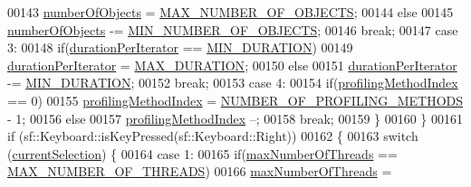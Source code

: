 \begin{DoxyCode}
00143                             \hyperlink{main_8cpp_a2303e0afaea24a80ed690de888548862}{numberOfObjects} = 
      \hyperlink{main_8cpp_aad62f3880f9d08f6213b65dc9373329e}{MAX\_NUMBER\_OF\_OBJECTS};
00144                         \textcolor{keywordflow}{else}
00145                             \hyperlink{main_8cpp_a2303e0afaea24a80ed690de888548862}{numberOfObjects} -= 
      \hyperlink{main_8cpp_a33029f68c1cf4a3c7c90cfb59edee648}{MIN\_NUMBER\_OF\_OBJECTS};
00146                         \textcolor{keywordflow}{break};
00147                     \textcolor{keywordflow}{case} 3:
00148                         \textcolor{keywordflow}{if}(\hyperlink{main_8cpp_a05d9b1ebdb968e99b310a90811f1be91}{durationPerIterator} == 
      \hyperlink{main_8cpp_af00d30c4c9cd2a4bcd0cb0084bcabd30}{MIN\_DURATION})
00149                             \hyperlink{main_8cpp_a05d9b1ebdb968e99b310a90811f1be91}{durationPerIterator} = 
      \hyperlink{main_8cpp_a2564fde0b4c94421653b40a37597aa62}{MAX\_DURATION};
00150                         \textcolor{keywordflow}{else}
00151                             \hyperlink{main_8cpp_a05d9b1ebdb968e99b310a90811f1be91}{durationPerIterator} -= 
      \hyperlink{main_8cpp_af00d30c4c9cd2a4bcd0cb0084bcabd30}{MIN\_DURATION};
00152                         \textcolor{keywordflow}{break};
00153                     \textcolor{keywordflow}{case} 4:
00154                         \textcolor{keywordflow}{if}(\hyperlink{main_8cpp_a610d48030bfa1d44ea8b35346a1b4b21}{profilingMethodIndex} == 0)
00155                             \hyperlink{main_8cpp_a610d48030bfa1d44ea8b35346a1b4b21}{profilingMethodIndex} = 
      \hyperlink{main_8cpp_aca088c8a49d09566c6c129c95c3e82c9}{NUMBER\_OF\_PROFILING\_METHODS} - 1;
00156                         \textcolor{keywordflow}{else}
00157                             \hyperlink{main_8cpp_a610d48030bfa1d44ea8b35346a1b4b21}{profilingMethodIndex} --;
00158                         \textcolor{keywordflow}{break};
00159                 \}
00160             \}
00161             \textcolor{keywordflow}{if} (sf::Keyboard::isKeyPressed(sf::Keyboard::Right))
00162             \{
00163                 \textcolor{keywordflow}{switch} (\hyperlink{main_8cpp_a0e589f9054cc1ee0716a7ecda74b1352}{currentSelection}) \{
00164                     \textcolor{keywordflow}{case} 1:
00165                         \textcolor{keywordflow}{if}(\hyperlink{main_8cpp_a4639134a7fa7033334111ff9d77316f3}{maxNumberOfThreads} == 
      \hyperlink{main_8cpp_ad903c6d94e1d79d2c7103b7eeebbff25}{MAX\_NUMBER\_OF\_THREADS})
00166                             \hyperlink{main_8cpp_a4639134a7fa7033334111ff9d77316f3}{maxNumberOfThreads} = 

\end{DoxyCode}
